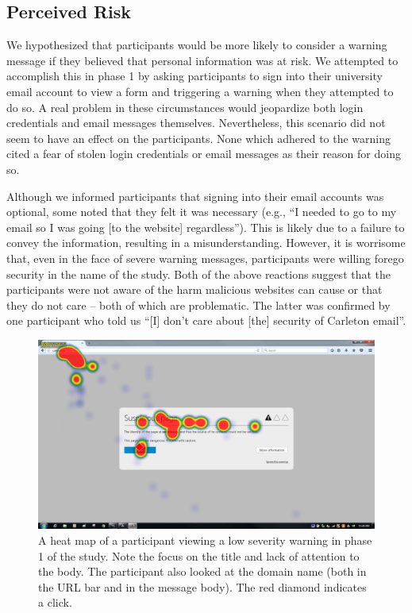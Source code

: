 \subsection{Perceived Risk}
We hypothesized that participants would be more likely to consider a warning message if they believed that personal information was at risk. We attempted to accomplish this in phase 1 by asking participants to sign into their university email account to view a form and triggering a warning when they attempted to do so. A real problem in these circumstances would jeopardize both login credentials and email messages themselves. Nevertheless, this scenario did not seem to have an effect on the participants. None which adhered to the warning cited a fear of stolen login credentials or email messages as their reason for doing so.

Although we informed participants that signing into their email accounts was optional, some noted that they felt it was necessary (e.g., ``I needed to go to my email so I was going [to the website] regardless''). This is likely due to a failure to convey the information, resulting in a misunderstanding. However, it is worrisome that, even in the face of severe warning messages, participants were willing forego security in the name of the study. Both of the above reactions suggest that the participants were not aware of the harm malicious websites can cause or that they do not care -- both of which are problematic. The latter was confirmed by one participant who told us ``[I] don't care about [the] security of Carleton email''.

\begin{figure}[!htb]
	\centering
	\includegraphics[width=\textwidth]{Figures/Heat-Map-P1-Low}
	\decoRule
	\caption[Phase 1 example heatmap]{A heat map of a participant viewing a low severity warning in phase 1 of the study. Note the focus on the title and lack of attention to the body. The participant also looked at the domain name (both in the URL bar and in the message body). The red diamond indicates a click.}
	\label{fig:Heatmap-Phase1}
\end{figure}

